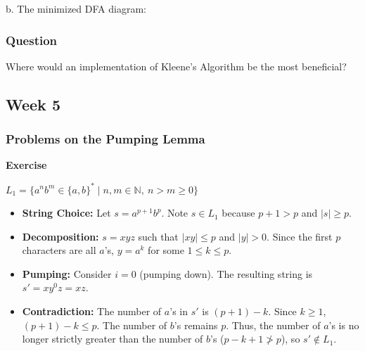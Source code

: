 \documentclass{article}
\theoremstyle{theorem}
\theoremstyle{definition}
\theoremstyle{remark}
\begin{document}
\vspace{2cm}

b. The minimized DFA diagram:

\subsubsection{Question}
Where would an implementation of Kleene's Algorithm be the most beneficial?

\subsection{Week 5}

\subsubsection{Problems on the Pumping Lemma}

\textbf{Exercise}

\textbf{$L_1 = \{ a^n b^m \in \{a,b\}^* \; | \; n,m \in \mathbb N, ~ n > m \ge 0 \}$}
\begin{itemize}
    \item \textbf{String Choice:} Let $s = a^{p+1}b^p$. Note $s \in L_1$ because $p+1 > p$ and $|s| \ge p$.
    \item \textbf{Decomposition:} $s = xyz$ such that $|xy| \le p$ and $|y| > 0$. Since the first $p$ characters are all $a$'s, $y = a^k$ for some $1 \le k \le p$.
    \item \textbf{Pumping:} Consider $i=0$ (pumping down). The resulting string is $s' = xy^0z = xz$.
    \item \textbf{Contradiction:} The number of $a$'s in $s'$ is $(p+1) - k$. Since $k \ge 1$, $(p+1) - k \le p$. The number of $b$'s remains $p$. Thus, the number of $a$'s is no longer strictly greater than the number of $b$'s ($p-k+1 \not> p$), so $s' \notin L_1$.
\end{itemize}
\end{document}
